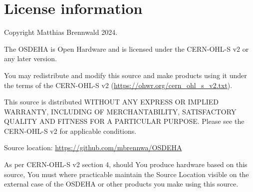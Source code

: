 {\footnotesize {}}

\clearpage
\section{License information} 
Copyright Matthias Brennwald 2024.                                                    

The OSDEHA is Open Hardware and is licensed under the CERN-OHL-S v2 or any later version.

You may redistribute and modify this source and make products using it under the terms of the CERN-OHL-S v2 (\url{https://ohwr.org/cern_ohl_s_v2.txt}).

This source is distributed WITHOUT ANY EXPRESS OR IMPLIED WARRANTY, INCLUDING OF MERCHANTABILITY, SATISFACTORY QUALITY AND FITNESS FOR A PARTICULAR PURPOSE. Please see the CERN-OHL-S v2 for applicable conditions.

Source location: \url{https://github.com/mbrennwa/OSDEHA}

As per CERN-OHL-S v2 section 4, should You produce hardware based on this source, You must where practicable maintain the Source Location visible on the external case of the OSDEHA or other products you make using this source.            


\clearpage





